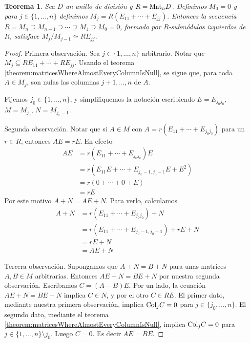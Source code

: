\documentclass{report}
\newcommand{\Mat}{\textnormal{Mat}}
\newcommand{\Col}{\textnormal{Col}}
\newtheorem{theorem}{Teorema}
\begin{document}
  \begin{theorem}\label{theorem:compositionSeriesOfLeftModulesForMatrixRing}
    Sea \(D\) un anillo de división y \(R = \Mat_n D\).
    Definimos \(M_0 = 0\) y para \(j \in \{1, \dots, n\}\) definimos \(M_j = R (E_{1 1} + \cdots + E_{j j})\).
    Entonces la secuencia \(R = M_n \supseteq M_{n - 1} \supseteq \cdots \supseteq M_1 \supseteq M_0 = 0\), formada por \(R\)-submódulos izquierdos de \(R\), satisface \(M_j / M_{j - 1} \simeq R E_{j j}\).
  \end{theorem}
  \begin{proof}
    Primera observación.
    Sea \(j \in \{1, \dots, n\}\) arbitrario.
    Notar que \(M_j \subseteq R E_{1 1} + \cdots + R E_{j j}\).
    Usando el teorema \ref{theorem:matricesWhereAlmostEveryColumnIsNull}, se sigue que, para toda \(A \in M_j\), son nulas las columnas \(j + 1, \dots, n\) de \(A\).

    Fijemos \(j_0 \in \{1, \dots, n\}\), y simplifiquemos la notación escribiendo \(E = E_{j_0 j_0}\), \(M = M_{j_0}\), \(N = M_{j_0 - 1}\).

    Segunda observación.
    Notar que si \(A \in M\) con \(A = r (E_{1 1} + \cdots + E_{j_0 j_0})\) para un \(r \in R\), entonces \(A E = r E\).
    En efecto
    \begin{align}
      A E
      &=
      r (E_{11} + \cdots + E_{j_0 j_0}) E
      \\
      &=
      r (E_{11} E + \cdots + E_{j_0 - 1, j_0 - 1} E + E^2)
      \\
      &=
      r (0 + \cdots + 0 + E)
      \\
      &=
      r E
    \end{align}
    Por este motivo \(A + N = A E + N\).
    Para verlo, calculamos
    \begin{align}
      A + N
      &=
      r (E_{1 1} + \cdots + E_{j_0 j_0}) + N
      \\
      &=
      r(E_{1 1} + \cdots + E_{j_0 - 1, j_0 - 1}) + r E + N
      \\
      &=
      r E + N
      \\
      &=
      A E + N
    \end{align}

    Tercera observación.
    Supongamos que \(A + N = B + N\) para unas matrices \(A, B \in M\) arbitrarias.
    Entonces \(A E + N = B E + N\) por nuestra segunda observación.
    Escribamos \(C = (A - B) E\).
    Por un lado, la ecuación \(A E + N = B E + N\) implica \(C \in N\), y por el otro \(C \in R E\).
    El primer dato, mediante nuestra primera observación, implica \(\Col_j C = 0\) para \(j \in \{j_0, \dots, n\}\).
    El segundo dato, mediante el teorema \ref{theorem:matricesWhereAlmostEveryColumnIsNull}, implica \(\Col_j C = 0\) para \(j \in \{1, \dots, n\} \setminus j_0\).
    Luego \(C = 0\).
    Es decir \(A E = B E\).


\end{proof}
\end{document}

